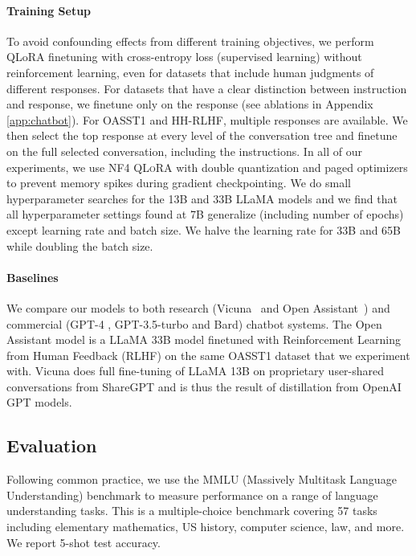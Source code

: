 \paragraph{Training Setup} To avoid confounding effects from different training objectives, we perform QLoRA finetuning with cross-entropy loss (supervised learning) without reinforcement learning, even for datasets that include human judgments of different responses. For datasets that have a clear distinction between instruction and response, we finetune only on the response (see ablations in Appendix \ref{app:chatbot}). For OASST1 and HH-RLHF, multiple responses are available. We then select the top response at every level of the conversation tree and finetune on the full selected conversation, including the instructions. In all of our experiments, we use NF4 \textsc{QLoRA} with double quantization and paged optimizers to prevent memory spikes during gradient checkpointing. We do small hyperparameter searches for the 13B and 33B LLaMA models and we find that all hyperparameter settings found at 7B generalize (including number of epochs) except learning rate and batch size. We halve the learning rate for 33B and 65B while doubling the batch size. 

\paragraph{Baselines} We compare our models to both research (Vicuna~\citep{vicuna2023} and Open Assistant~\citep{kopf2023openassistant}) and commercial (GPT-4 \citep{openai2023gpt}, GPT-3.5-turbo and Bard) chatbot systems. The Open Assistant model is a LLaMA 33B model finetuned with Reinforcement Learning from Human Feedback (RLHF) on the same OASST1 dataset that we experiment with. Vicuna does full fine-tuning of LLaMA 13B on proprietary user-shared conversations from ShareGPT and is thus the result of distillation from OpenAI GPT models.

\subsection{Evaluation}

Following common practice, we use the MMLU (Massively Multitask Language Understanding) benchmark \citep{hendrycksmeasuring} to measure performance on a range of language understanding tasks. This is a multiple-choice benchmark covering 57 tasks including elementary mathematics, US history, computer science, law, and more. We report 5-shot test accuracy.

